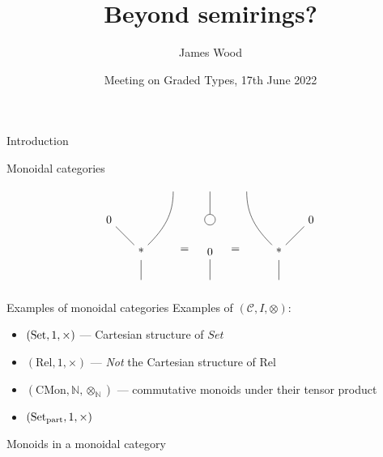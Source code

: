 \documentclass[fleqn]{beamer}
\title{Beyond semirings?}
\author{James Wood}
\institute{University of Strathclyde \and Huawei Technologies R\&D UK}
\date{Meeting on Graded Types, 17th June 2022}
\newcommand\Rel{\mathrm{Rel}}
\begin{document}
\frame{\titlepage}

\begin{frame}{Introduction}
\end{frame}

\begin{frame}{Monoidal categories}
\[
  \begin{tikzpicture}[baseline]
    \path
    (-1,1) node(0) {0}
    (1,2) node(x) {}
    (0,0) node(*) {*}
    (0,-1) node(res) {}
    ;

    \draw (0) -- (*);
    \draw (x) to[out=270,in=45] (*);
    \draw (*) -- (res);
  \end{tikzpicture}
  =\quad
  \begin{tikzpicture}[baseline]
    \path
    (0,0) node(0) {0}
    (0,2) node(x) {}
    (0,-1) node(res) {}
    (0,1) node[circle,draw](del) {}
    ;

    \draw (0) -- (res);
    \draw (x) -- (del);
  \end{tikzpicture}
  \quad=
  \begin{tikzpicture}[baseline]
    \path
    (1,1) node(0) {0}
    (-1,2) node(x) {}
    (0,0) node(*) {*}
    (0,-1) node(res) {}
    ;

    \draw (0) -- (*);
    \draw (x) to[out=270,in=135] (*);
    \draw (*) -- (res);
  \end{tikzpicture}
\]
\end{frame}

\begin{frame}{Examples of monoidal categories}
  Examples of $(\mathcal C, I, \otimes)$:
  \begin{itemize}
    \item $(\operatorname{Set}, 1, \times)$ --- Cartesian structure of $Set$
    \item $(\Rel, 1, \times)$ --- \emph{Not} the Cartesian structure of $\Rel$
    \item $(\mathrm{CMon}, \mathbb N, \otimes_{\mathbb N})$ ---
      commutative monoids under their tensor product
    \item $(\operatorname{Set}_{\mathrm{part}}, 1, \times)$
  \end{itemize}
\end{frame}

\begin{frame}{Monoids in a monoidal category}
\end{frame}

\end{document}
